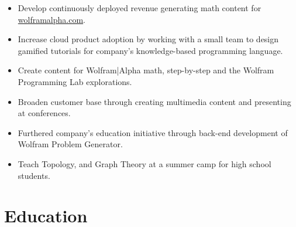 \documentclass[11pt,a4paper,unicode]{moderncv}
\begin{document}
\cvline{}
{\begin{itemize} 
	\item Develop continuously deployed revenue generating math content for \url{wolframalpha.com}. 
	 \item Increase cloud product adoption by working with a small team to design gamified tutorials for company's knowledge-based programming language. 
	 \item Create content for Wolfram|Alpha math, step-by-step and the Wolfram Programming Lab explorations.
	 \item Broaden customer base through creating multimedia content and presenting at conferences.
	  \item Furthered company's education initiative through back-end development of Wolfram Problem Generator.
	  \item Teach Topology, and Graph Theory at a summer camp for high school students.
 \end{itemize}}
	 
\vspace{-.5cm}





\section{Education}


\vspace{-1mm}
\vspace{-1mm}
  

\end{document}
